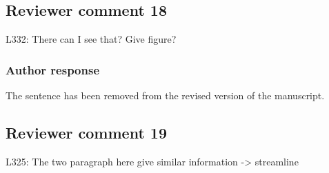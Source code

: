 %
%
%


\subsection*{Reviewer comment 18}
L332: There can I see that? Give figure?

\subsubsection*{Author response}

The sentence has been removed from the revised version of the manuscript.

\subsection*{Reviewer comment 19}
L325: The two paragraph here give similar information -> streamline

